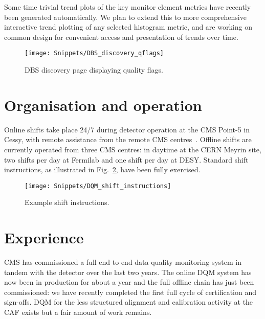 \documentclass[a4paper]{jpconf}
\begin{document}
Some time trivial trend plots of the key monitor element metrics have recently
been generated automatically.  We plan to extend this to more comprehensive
interactive trend plotting of any selected histogram metric, and are working
on common design for convenient access and presentation of trends over time.

\begin{figure}[!tbp]
\begin{center}
\texttt{[image: Snippets/DBS\_discovery\_qflags]}
\caption{\label{fig:dbsqflags}DBS discovery page displaying quality flags.}
\end{center}
\end{figure}


\section{Organisation and operation}

Online shifts take place 24/7 during detector operation at the CMS Point-5 in
Cessy, with remote assistance from the remote CMS
centres~\cite{cms_centres_09}.  Offline shifts are currently operated from
three CMS centres: in daytime at the CERN Meyrin site, two shifts per day at
Fermilab and one shift per day at DESY.  Standard shift instructions, as
illustrated in Fig.~\ref{fig:shiftdoc}, have been fully exercised.

\begin{figure}[!tbp]
\begin{center}
\texttt{[image: Snippets/DQM\_shift\_instructions]}
\caption{\label{fig:shiftdoc}Example shift instructions.}
\end{center}
\end{figure}


\section{Experience}

CMS has commissioned a full end to end data quality monitoring system in
tandem with the detector over the last two years.  The online DQM system has
now been in production for about a year and the full offline chain has just
been commissioned: we have recently completed the first full cycle of
certification and sign-offs.  DQM for the less structured alignment and
calibration activity at the CAF exists but a fair amount of work remains.
\end{document}
